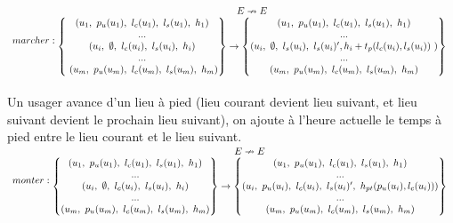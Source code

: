 \documentclass[french]{article}
\begin{document}
$\displaystyle  \begin{array}{{>{\displaystyle}l}}
marcher:
\begin{matrix}
E\nrightarrow E\\
\begin{Bmatrix}
( u_{1} ,\ p_{u}( u_{1}) ,\ l_{c}( u_{1}) ,\ l_{s}( u_{1}) ,\ h_{1})\\
...\\
( u_{i} ,\ \emptyset ,\ l_{c}( u_{i}) ,\ l_{s}( u_{i}) ,\ h_{i})\\
...\\
\ ( u_{m} ,\ p_{u}( u_{m}) ,\ l_{c}( u_{m}) ,\ l_{s}( u_{m}) ,\ h_{m})
\end{Bmatrix}\rightarrow \begin{Bmatrix}
( u_{1} ,\ p_{u}( u_{1}) ,\ l_{c}( u_{1}) ,\ l_{s}( u_{1}) ,\ h_{1})\\
...\\
( u_{i} ,\ \emptyset ,\ l_{s}( u_{i}) ,\ l_{s}( u_{i}) ',h_{i} +t_{p}( l_{c}( u_{i}) ,l_{s}( u_{i})) \ )\\
...\\
( u_{m} ,\ p_{u}( u_{m}) ,\ l_{c}( u_{m}) ,\ l_{s}( u_{m}) ,\ h_{m})
\end{Bmatrix}
\end{matrix} \ 
\end{array}$\\
\\
Un usager avance d'un lieu à pied (lieu courant devient lieu suivant, et lieu suivant devient le prochain lieu suivant), on ajoute à l'heure actuelle le temps à pied entre le lieu courant et le lieu suivant.
\vspace*{0.5cm}
\\
$\displaystyle  \begin{array}{{>{\displaystyle}l}}
monter:
\begin{matrix}
E\nrightarrow E\\
\begin{Bmatrix}
( u_{1} ,\ p_{u}( u_{1}) ,\ l_{c}( u_{1}) ,\ l_{s}( u_{1}) ,\ h_{1})\\
...\\
( u_{i} ,\ \emptyset ,\ l_{c}( u_{i}) ,\ l_{s}( u_{i}) ,\ h_{i})\\
...\\
( u_{m} ,\ p_{u}( u_{m}) ,\ l_{c}( u_{m}) ,\ l_{s}( u_{m}) ,\ h_{m})
\end{Bmatrix}\rightarrow \begin{Bmatrix}
( u_{1} ,\ p_{u}( u_{1}) ,\ l_{c}( u_{1}) ,\ l_{s}( u_{1}) ,\ h_{1})\\
...\\
( u_{i} ,\ p_{u}( u_{i}) ,\ l_{c}( u_{i}) ,\ l_{s}( u_{i}) ',\ h_{pt}( p_{u}( u_{i}) ,l_{c}( u_{i})))\\
...\\
( u_{m} ,\ p_{u}( u_{m}) ,\ l_{c}( u_{m}) ,\ l_{s}( u_{m}) ,\ h_{m})
\end{Bmatrix}
\end{matrix} \ 
\end{array}$\\
\end{document}
